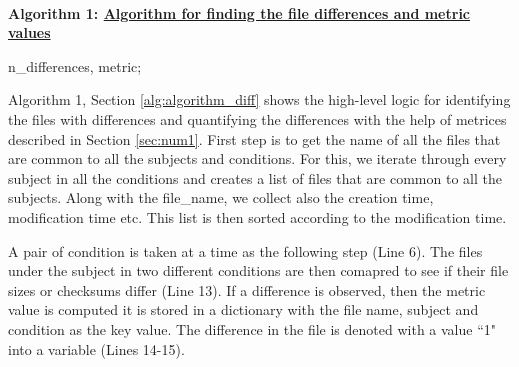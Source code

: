 \newpage
\textbf{\\Algorithm 1: \underline{Algorithm for finding the file differences and metric values}\label{alg:algorithm_diff}\\}
\DontPrintSemicolon
{}
{
\begin{algorithmic}[1]
\ENDFOR
\ENDFOR
{}
     
      
         
          \ENDIF
         
         
      \ENDFOR
  \ENDFOR
\ENDFOR
\end{algorithmic}
\KwRet n\_differences, metric;
}
\vskip 0.2in

Algorithm 1, Section \ref{alg:algorithm_diff} shows the high-level logic for identifying the files with differences and quantifying the differences with the help of metrices described in Section \ref{sec:num1}. First step is to get the name of all the files that are common to all the subjects and conditions. For this, we iterate through every subject in all the conditions and creates a list of files that are common to all the subjects. Along with the file\_name, we collect also the creation time, modification time etc. This list is then sorted according to the modification time. 

A pair of condition is taken at a time as the following step (Line 6). The files under the subject in two different conditions are then comapred to see if their file sizes or checksums differ (Line 13). If a difference is observed, then the metric value is computed it is stored in a dictionary with the file name, subject and condition as the key value. The difference in the file is denoted with a value ``1" into a variable (Lines 14-15).

